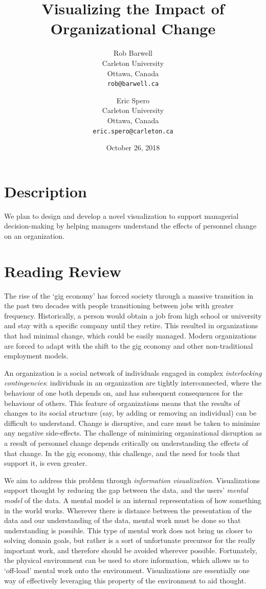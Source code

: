 \documentclass[12pt,letterpaper]{article}
\title{Visualizing the Impact of Organizational Change}
\author{
  Rob Barwell\\ 
  \small \vspace{-.15cm}Carleton University\\
  \small Ottawa, Canada\\
  \small \texttt{rob@barwell.ca}
  \and
  Eric Spero\\ 
  \small \vspace{-.15cm}Carleton University\\
  \small Ottawa, Canada\\
  \small \texttt{eric.spero@carleton.ca}
}
\date{October 26, 2018}
\begin{document}
\maketitle

\section{Description}

We plan to design and develop a novel visualization to support managerial decision-making by helping managers understand the effects of personnel change on an organization.

\section{Reading Review}

The rise of the \lq gig economy\rq{}\cite{de2015rise,friedman2014workers} has forced society through a massive transition in the past two decades with people transitioning between jobs with greater frequency.  Historically, a person would obtain a job from high school or university and stay with a specific company until they retire.  This resulted in organizations that had minimal change, which could be easily managed. Modern organizations are forced to adapt with the shift to the gig economy and other non-traditional employment models.  

An organization is a social network\cite{scott1988social} of individuals engaged in complex \emph{interlocking contingencies}\cite{glenn2006complexity}: individuals in an organization are tightly interconnected, where the behaviour of one both depends on, and has subsequent consequences for the behaviour of others\cite{glenn2006complexity}. This feature of organizations means that the results of changes to its social structure (say, by adding or removing an individual) can be difficult to understand. Change is disruptive, and care must be taken to minimize any negative side-effects. The challenge of minimizing organizational disruption as a result of personnel change depends critically on understanding the effects of that change. In the gig economy, this challenge, and the need for tools that support it, is even greater. 

We aim to address this problem through \emph{information visualization}. Visualizations support thought by reducing the gap between the data, and the users' \emph{mental model} of the data\cite{yi2007toward}. A mental model is an internal representation of how something in the world works\cite{staggersmodel,norman2014some}. Wherever there is distance between the presentation of the data and our understanding of the data, mental work must be done so that understanding is possible. This type of mental work does not bring us closer to solving domain goals, but rather is a sort of unfortunate precursor for the really important work, and therefore should be avoided wherever possible\cite{paas2003cognitive}. Fortunately, the physical environment can be used to store information, which allows us to \lq off-load\rq{} mental work onto the environment\cite{wilson2002six}. Visualizations are essentially one way of effectively leveraging this property of the environment to aid thought.
\end{document}

